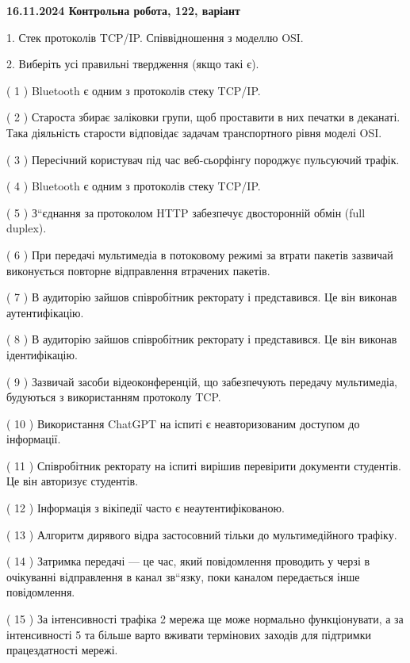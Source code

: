\documentclass[12pt, ukrainian]{article}
\begin{document}
\vspace{4mm}
\newpage
\begin {large}

\textbf{16.11.2024 Контрольна робота, 122, варіант  }\par


{
1. Стек протоколів TCP/IP. Співвідношення з моделлю OSI.



\vspace{5mm}
2. Виберіть усі правильні твердження (якщо такі є).\par
\vspace{2mm}

( 1 ) Bluetooth є одним з протоколів стеку TCP/IP.

( 2 ) Староста збирає заліковки групи, щоб проставити в них печатки в деканаті. Така діяльність старости відповідає задачам транспортного рівня моделі OSI.

( 3 ) Пересічний користувач під час веб-сьорфінгу породжує пульсуючий трафік.

( 4 ) Bluetooth є одним з протоколів стеку TCP/IP.

( 5 ) З“єднання за протоколом  HTTP забезпечує двосторонній обмін (full duplex).

( 6 ) При передачі мультимедіа в потоковому режимі за втрати пакетів зазвичай виконується повторне відправлення втрачених пакетів.

( 7 ) В аудиторію зайшов співробітник ректорату і представився. Це він виконав аутентифікацію.

( 8 ) В аудиторію зайшов співробітник ректорату і представився. Це він виконав ідентифікацію.

( 9 ) Зазвичай засоби відеоконференцій, що забезпечують передачу мультимедіа, будуються з використанням протоколу TCP.

( 10 ) Використання ChatGPT на іспиті є неавторизованим доступом до інформації.

( 11 ) Співробітник ректорату на іспиті вирішив перевірити документи студентів. Це він авторизує студентів.

( 12 ) Інформація з вікіпедії часто є неаутентифікованою.

( 13 ) Алгоритм дирявого відра застосовний тільки до мультимедійного трафіку.

( 14 ) Затримка передачі — це час, який повідомлення проводить у черзі в очікуванні відправлення в канал зв“язку, поки каналом передається інше повідомлення.

( 15 ) За інтенсивності трафіка 2 мережа ще може нормально функціонувати, а за інтенсивності 5 та більше варто вживати термінових заходів для підтримки працездатності мережі.
}
\end {large}
\end{document}
